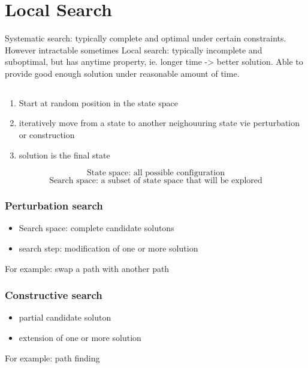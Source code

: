 \documentclass{article}
\begin{document}
\section{Local Search}
Systematic search: typically complete and optimal under certain constraints. However intractable sometimes\newline
Local search: typically incomplete and suboptimal, but has anytime property, ie. longer time -> better solution. Able to provide good enough solution under reasonable amount of time. \newline


\subsection{}
\begin{enumerate}
    \item Start at random position in the state space
    \item iteratively move from a state to another neighouuring state vie perturbation or construction 
    \item solution is the final state 
\end{enumerate}

\begin{equation}
    \text{State space: all possible configuration}
\end{equation}
\begin{equation}
    \text{Search space: a subset of state space that will be explored}
\end{equation}

\subsubsection{Perturbation search}
\begin{itemize}
    \item Search space: complete candidate solutons
    \item search step: modification of one or more solution 
\end{itemize}
For example: swap a path with another path \newline
\subsubsection{Constructive search}
\begin{itemize}
    \item partial candidate soluton
    \item extension of one or more solution
\end{itemize}
For example: path finding\newline
\end{document}
